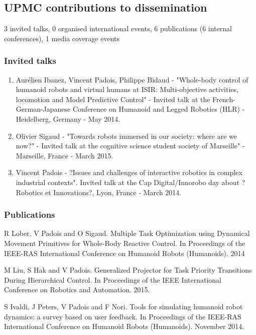 \subsection{UPMC contributions to dissemination}

3 invited talks, 0 organised international events, 6 publications (6 internal conferences), 1 media coverage events

\subsubsection{Invited talks}

\begin{enumerate}
\item Aurélien Ibanez, Vincent Padois, Philippe Bidaud - "Whole-body control of humanoid robots and virtual humans at ISIR: Multi-objective activities, locomotion and Model Predictive Control" - Invited talk at the French-German-Japanese Conference on Humanoid and Legged Robotics (HLR) - Heidelberg,  Germany - May 2014.

\item Olivier Sigaud - "Towards robots immersed in our society: where are we now?" - Invited talk at  the cognitive science student society of Marseille" -  Marseille, France - March 2015.

\item Vincent Padois - ?Issues and challenges of interactive robotics in complex industrial contexts". Invited talk at the Cap Digital/Innorobo day about ?Robotics et Innovations?, Lyon, France - March 2014.
\end{enumerate}

\subsubsection{Publications}
R Lober, V Padois and O Sigaud. Multiple Task Optimization using Dynamical Movement Primitives for Whole-Body Reactive Control. In Proceedings of the IEEE-RAS International Conference on Humanoid Robots (Humanoids). 2014

M Liu, S Hak and V Padois. Generalized Projector for Task Priority Transitions During Hierarchical Control. In Proceedings of the IEEE International Conference on Robotics and Automation. 2015.

S Ivaldi, J Peters, V Padois and F Nori. Tools for simulating humanoid robot dynamics: a survey based on user feedback. In Proceedings of the IEEE-RAS International Conference on Humanoid Robots (Humanoids). November 2014.

